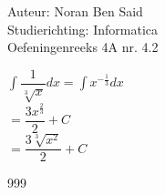 \documentclass[a4paper]{article}
\begin{document}
  
\noindent \large Auteur: Noran Ben Said \\
\noindent \large Studierichting: Informatica\\
\noindent \large Oefeningenreeks 4A nr. 4.2\\

\medskip

\normalsize


$\displaystyle\int \dfrac{1}{\sqrt[3]{x}} dx = \displaystyle\int x^{-\tfrac{1}{3}} dx$\\

$ = \dfrac{3x^{\tfrac{2}{3}}}{2} + C$\\

$ = \dfrac{3\sqrt[3]{x^2}}{2} + C $\\




\begin{thebibliography}{999}
\end{thebibliography}
\end{document}
